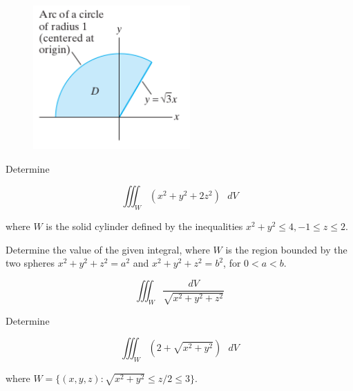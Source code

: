 \documentclass[11pt,letterpaper,boxed]{pset}
\begin{document}
    \begin{figure}[h!]
    	\includegraphics[width=60mm]{region.png}
    \end{figure}
    \newpage
    
    
    \begin{problem} [5.5.31]
    	Determine
    
    	\[\iiint_W (x^2+y^2+2z^2)\textrm{ }dV\]
    
    	where $W$ is the solid cylinder defined by the inequalities $x^2+y^2 \leq 4, -1 \leq z \leq 2.$
    \end{problem}
    \newpage
    
    
    \begin{problem} [5.5.34]
    	Determine the value of the given integral, where $W$ is the region bounded by the two spheres $x^2+y^2+z^2=a^2$ and $x^2+y^2+z^2=b^2$, for $0 < a < b$.
    
    	\[\iiint_W \frac{dV}{\sqrt{x^2+y^2+z^2}}\]
    \end{problem}
    \newpage
    
    
    \begin{problem} [5.5.38]
    	Determine
    
    	\[\iiint_W (2 + \sqrt{x^2+y^2})\textrm{ }dV\]
    
    	where $W = \{(x,y,z) : \sqrt{x^2+y^2} \leq z/2 \leq 3\}.$
    \end{problem}
    \newpage
    
\end{document}
